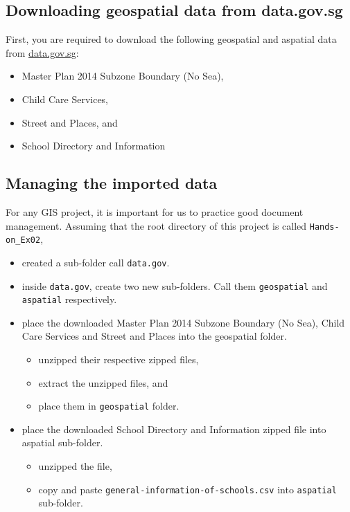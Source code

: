 \documentclass[
  letterpaper,
  DIV=11,
  numbers=noendperiod]{scrreprt}
\providecommand{\tightlist}{%
  \setlength{\itemsep}{0pt}\setlength{\parskip}{0pt}}\usepackage{longtable,booktabs,array}
\begin{document}
\hypertarget{downloading-geospatial-data-from-data.gov.sg}{%
\subsection{Downloading geospatial data from
data.gov.sg}\label{downloading-geospatial-data-from-data.gov.sg}}

First, you are required to download the following geospatial and
aspatial data from \href{https://data.gov.sg/}{data.gov.sg}:

\begin{itemize}
\tightlist
\item
  Master Plan 2014 Subzone Boundary (No Sea),
\item
  Child Care Services,
\item
  Street and Places, and
\item
  School Directory and Information
\end{itemize}

\hypertarget{managing-the-imported-data}{%
\subsection{Managing the imported
data}\label{managing-the-imported-data}}

For any GIS project, it is important for us to practice good document
management. Assuming that the root directory of this project is called
\texttt{Hands-on\_Ex02},

\begin{itemize}
\tightlist
\item
  created a sub-folder call \texttt{data.gov}.\\
\item
  inside \texttt{data.gov}, create two new sub-folders. Call them
  \texttt{geospatial} and \texttt{aspatial} respectively.
\item
  place the downloaded Master Plan 2014 Subzone Boundary (No Sea), Child
  Care Services and Street and Places into the geospatial folder.

  \begin{itemize}
  \tightlist
  \item
    unzipped their respective zipped files,
  \item
    extract the unzipped files, and
  \item
    place them in \texttt{geospatial} folder.
  \end{itemize}
\item
  place the downloaded School Directory and Information zipped file into
  aspatial sub-folder.

  \begin{itemize}
  \tightlist
  \item
    unzipped the file,
  \item
    copy and paste \texttt{general-information-of-schools.csv} into
    \texttt{aspatial} sub-folder.
  \end{itemize}
\end{itemize}
\end{document}
